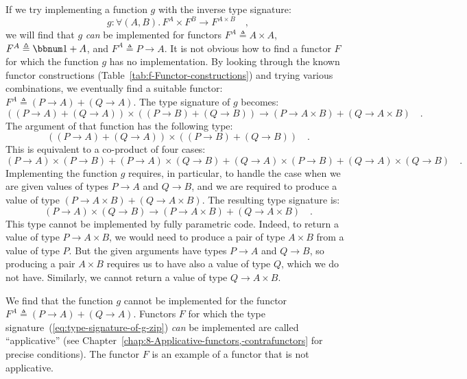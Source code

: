 If we try implementing a function $g$ with the inverse type signature:
\begin{equation}
g:\forall(A,B).\,F^{A}\times F^{B}\rightarrow F^{A\times B}\quad,\label{eq:type-signature-of-g-zip}
\end{equation}
we will find that $g$ \emph{can} be implemented for functors $F^{A}\triangleq A\times A$,
$F^{A}\triangleq\bbnum 1+A$, and $F^{A}\triangleq P\rightarrow A$.
It is not obvious how to find a functor $F$ for which the function
$g$ has no implementation. By looking through the known functor constructions
(Table~\ref{tab:f-Functor-constructions}) and trying various combinations,
we eventually find a suitable functor: $F^{A}\triangleq(P\rightarrow A)+(Q\rightarrow A)$.
The type signature of $g$ becomes:
\[
\left((P\rightarrow A)+(Q\rightarrow A)\right)\times\left((P\rightarrow B)+(Q\rightarrow B)\right)\rightarrow(P\rightarrow A\times B)+(Q\rightarrow A\times B)\quad.
\]
The argument of that function has the following type:
\[
\left((P\rightarrow A)+(Q\rightarrow A)\right)\times\left((P\rightarrow B)+(Q\rightarrow B)\right)\quad.
\]
This is equivalent to a co-product of four cases:
\[
(P\rightarrow A)\times(P\rightarrow B)+(P\rightarrow A)\times(Q\rightarrow B)+(Q\rightarrow A)\times(P\rightarrow B)+(Q\rightarrow A)\times(Q\rightarrow B)\quad.
\]
Implementing the function $g$ requires, in particular, to handle
the case when we are given values of types $P\rightarrow A$ and $Q\rightarrow B$,
and we are required to produce a value of type $(P\rightarrow A\times B)+(Q\rightarrow A\times B)$.
The resulting type signature is:
\[
(P\rightarrow A)\times(Q\rightarrow B)\rightarrow(P\rightarrow A\times B)+(Q\rightarrow A\times B)\quad.
\]
This type cannot be implemented by fully parametric code. Indeed,
to return a value of type $P\rightarrow A\times B$, we would need
to produce a pair of type $A\times B$ from a value of type $P$.
But the given arguments have types $P\rightarrow A$ and $Q\rightarrow B$,
so producing a pair $A\times B$ requires us to have also a value
of type $Q$, which we do not have. Similarly, we cannot return a
value of type $Q\rightarrow A\times B$.

We find that the function $g$ cannot be implemented for the functor
$F^{A}\triangleq(P\rightarrow A)+(Q\rightarrow A)$. Functors $F$
for which the type signature~(\ref{eq:type-signature-of-g-zip})
\emph{can} be implemented are called \textsf{``}applicative\textsf{''}
(see Chapter~\ref{chap:8-Applicative-functors,-contrafunctors} for
precise conditions). The functor $F$ is an example of a functor that
is not applicative.


